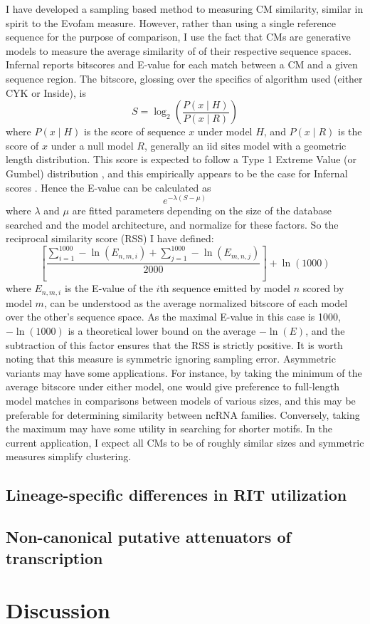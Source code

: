 I have developed a sampling based method to measuring CM similarity, similar in spirit to the Evofam measure. However, rather than using a single reference sequence for the purpose of comparison, I use the fact that CMs are generative models to measure the average similarity of of their respective sequence spaces. Infernal reports bitscores and E-value for each match between a CM and a given sequence region. The bitscore, glossing over the specifics of algorithm used (either CYK or Inside), is \[S = \log_2\left({\frac{P(x \mid H)}{P(x \mid R)}}\right)\] where $P(x \mid H)$ is the score of sequence $x$ under model $H$, and $P(x \mid R)$ is the score of $x$ under a null model $R$, generally an iid sites model with a geometric length distribution. This score is expected to follow a Type 1 Extreme Value (or Gumbel) distribution \parencite{Karlin1990, Eddy2008}, and this empirically appears to be the case for Infernal scores \parencite{Nawrocki2007}. Hence the E-value can be calculated as \[e^{-\lambda(S - \mu)}\] where $\lambda$ and $\mu$ are fitted parameters depending on the size of the database searched and the model architecture, and normalize for these factors. So the reciprocal similarity score (RSS) I have defined: \[ \left[\frac{\sum_{i=1}^{1000} -\ln{(E_{n,m,i})} +  \sum_{j=1}^{1000} -\ln{(E_{m,n,j})}}{2000}\right] + \ln(1000) \] where $E_{n,m,i}$ is the E-value of the $i$th sequence emitted by model $n$ scored by model $m$, can be understood as the average normalized bitscore of each model over the other's sequence space. As the maximal E-value in this case is 1000, $-\ln(1000)$ is a theoretical lower bound on the average $-\ln{(E)}$, and the subtraction of this factor ensures that the RSS is strictly positive. It is worth noting that this measure is symmetric ignoring sampling error. Asymmetric variants may have some applications. For instance, by taking the minimum of the average bitscore under either model, one would give preference to full-length model matches in comparisons between models of various sizes, and this may be preferable for determining similarity between ncRNA families. Conversely, taking the maximum may have some utility in searching for shorter motifs. In the current application, I expect all CMs to be of roughly similar sizes and symmetric measures simplify clustering.

\subsection{Lineage-specific differences in RIT utilization}

\subsection{Non-canonical putative attenuators of transcription}

\section{Discussion}